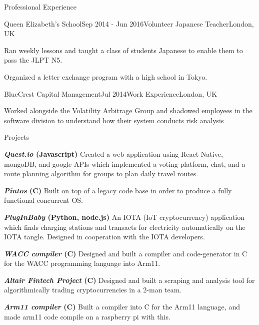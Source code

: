 \documentclass[10pt]{resume} %
\begin{document}
\begin{rSection}{Professional Experience}

\begin{rSubsection}{Queen Elizabeth's School}{Sep 2014 - Jun 2016}{Volunteer Japanese Teacher}{London, UK}
    \item Ran weekly lessons and taught a class of students Japanese to enable them to pass the JLPT N5.
    \item Organized a letter exchange program with a high school in Tokyo.
\end{rSubsection}


\begin{rSubsection}{BlueCrest Capital Management}{Jul 2014}{Work Experience}{London, UK}
    \item Worked alongside the Volatility Arbitrage Group and shadowed employees in the software division to understand how their system conducts risk analysis
\end{rSubsection}

\end{rSection}


\begin{rSection}{Projects}
    \item \textbf{\textit{Quest.io} (Javascript)} Created a web application
using React Native, mongoDB, and google APIs which implemented a voting
platform, chat, and a route planning algorithm for groups to plan daily travel
routes.
    \item \textbf{\textit{Pintos} (C)} Built on top of a legacy code base in
order to produce a fully functional concurrent OS.
    \item \textbf{\textit{PlugInBaby} (Python, node.js)} An IOTA (IoT
cryptocurrency) application which finds charging stations and transacts for
electricity automatically on the IOTA tangle. Designed in cooperation with the
IOTA developers.
    \item \textbf{\textit{WACC compiler} (C)} Designed and built a compiler and
code-generator in C for the WACC programming language into Arm11.
    \item \textbf{\textit{Altair Fintech Project} (C)} Designed and built a
scraping and analysis tool for algorithmically trading cryptocurrencies in a
2-man team.
    \item \textbf{\textit{Arm11 compiler} (C)} Built a compiler into C for the Arm11 language, and made arm11 code compile on a raspberry pi with this.
\end{rSection}
\end{document}
